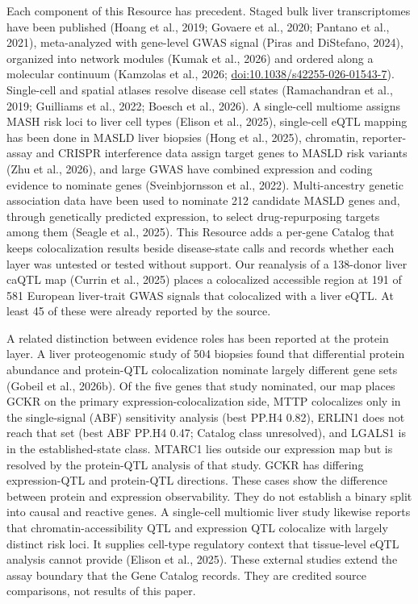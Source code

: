 Each component of this Resource has precedent. Staged bulk liver transcriptomes
have been published (Hoang et al., 2019; Govaere et al., 2020; Pantano et al.,
2021), meta-analyzed with gene-level GWAS signal (Piras and DiStefano, 2024),
organized into network modules (Kumak et al., 2026) and ordered along a molecular continuum
(Kamzolas et al., 2026; \url{doi:10.1038/s42255-026-01543-7}). Single-cell and
spatial atlases resolve disease cell states (Ramachandran et al., 2019;
Guilliams et al., 2022; Boesch et al., 2026). A single-cell multiome assigns MASH
risk loci to liver cell types (Elison et al., 2025), single-cell eQTL mapping has been
done in MASLD liver biopsies (Hong et al., 2025), chromatin,
reporter-assay and CRISPR interference data assign target genes to MASLD risk
variants (Zhu et al., 2026), and large GWAS have combined
expression and coding evidence to nominate genes (Sveinbjornsson et al., 2022).
Multi-ancestry genetic association data have been used to nominate 212
candidate MASLD genes and, through genetically predicted expression, to select
drug-repurposing targets among them (Seagle et al., 2025).
This Resource adds a per-gene Catalog that keeps colocalization results beside
disease-state calls and records whether each layer was untested or tested
without support. Our reanalysis of a 138-donor liver caQTL map (Currin et al.,
2025) places a colocalized accessible region at 191 of 581 European liver-trait
GWAS signals that colocalized with a liver eQTL. At least 45 of these were
already reported by the source.

A related distinction between evidence roles has been reported at the protein layer. A
liver proteogenomic study of 504 biopsies found that differential protein
abundance and protein-QTL colocalization nominate largely different gene sets
(Gobeil et al., 2026b). Of the
five genes that study nominated, our map places GCKR on the primary
expression-colocalization side, MTTP colocalizes only in the
single-signal (ABF) sensitivity analysis (best PP.H4 0.82), ERLIN1 does not
reach that set (best ABF PP.H4 0.47; Catalog class unresolved), and LGALS1 is in the established-state class. MTARC1 lies outside our
expression map but is resolved by the protein-QTL analysis of that study. GCKR
has differing expression-QTL and protein-QTL directions. These cases show the
difference between protein and expression observability. They do not establish
a binary split into causal and reactive genes. A single-cell multiomic liver
study likewise reports that chromatin-accessibility QTL and expression QTL
colocalize with largely distinct risk loci. It supplies cell-type regulatory
context that tissue-level eQTL analysis cannot provide (Elison et al., 2025).
These external studies extend the assay boundary that the Gene Catalog records.
They are credited source comparisons, not results of this paper.

